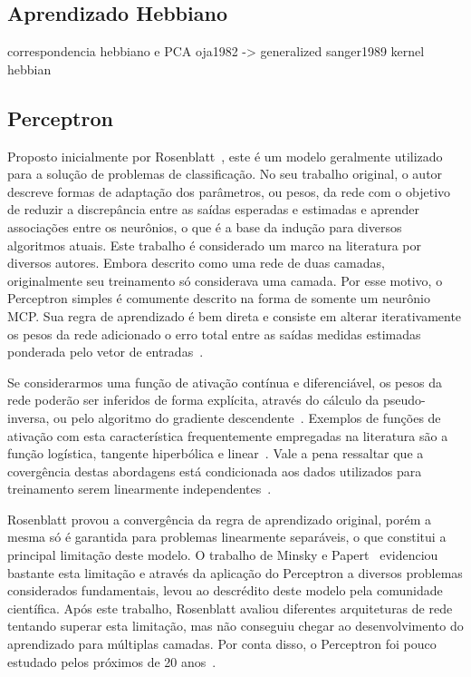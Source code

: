 \documentclass[conference]{IEEEtran}
\begin{document}
	\subsection{Aprendizado Hebbiano}
	
	correspondencia hebbiano e PCA
	oja1982 ->	generalized sanger1989
	kernel hebbian
	
	

	\subsection{Perceptron}
	Proposto inicialmente por Rosenblatt~\cite{rosenblatt1957perceptron}, este é um modelo geralmente utilizado para a solução de problemas de classificação. No seu trabalho original, o autor descreve formas de adaptação dos parâmetros, ou pesos, da rede com o objetivo de reduzir a discrepância entre as saídas esperadas e estimadas e aprender associações entre os neurônios, o que é a base da indução para diversos algoritmos atuais. Este trabalho é considerado um marco na literatura por diversos autores. Embora descrito como uma rede de duas camadas, originalmente seu treinamento só considerava uma camada. Por esse motivo, o Perceptron simples é comumente descrito na forma de somente um neurônio MCP. Sua regra de aprendizado é bem direta e consiste em alterar iterativamente os pesos da rede adicionado o erro total entre as saídas medidas estimadas ponderada pelo vetor de entradas~\cite{haykin2007neural}. 
	
	Se considerarmos uma função de ativação contínua e diferenciável, os pesos da rede poderão ser inferidos de forma explícita, através do cálculo da pseudo-inversa, ou pelo algoritmo do gradiente descendente~\cite{hertz1991introduction}. Exemplos de funções de ativação com esta característica frequentemente empregadas na literatura são a função logística, tangente hiperbólica e linear~\cite{jain1996artificial}. Vale a pena ressaltar que a covergência destas abordagens está condicionada aos dados utilizados para treinamento serem linearmente independentes~\cite{hertz1991introduction}.
	
	Rosenblatt provou a convergência da regra de aprendizado original, porém a mesma só é garantida para problemas linearmente separáveis, o que constitui a principal limitação deste modelo. O trabalho de Minsky e Papert~\cite{minsky1969introduction} evidenciou bastante esta limitação e através da aplicação do Perceptron a diversos problemas considerados fundamentais, levou ao descrédito deste modelo pela comunidade científica. Após este trabalho, Rosenblatt avaliou diferentes arquiteturas de rede tentando superar esta limitação, mas não conseguiu chegar ao desenvolvimento do aprendizado para múltiplas camadas. Por conta disso, o Perceptron foi pouco estudado pelos próximos de 20 anos~\cite{hertz1991introduction}.
	
\end{document}

